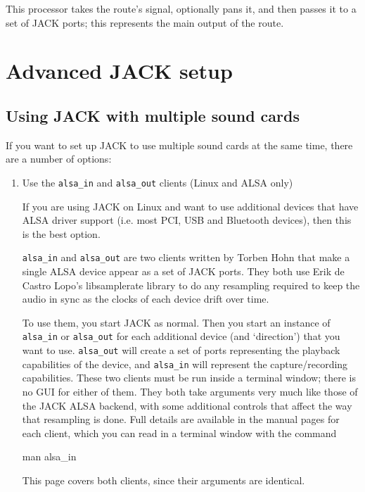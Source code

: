 \documentclass[10pt,a4paper]{book}
\begin{document}
This processor takes the route's signal, optionally pans it, and then
passes it to a set of JACK ports; this represents the main output of
the route.


\appendix
\chapter{Advanced JACK setup}
\label{ap:advanced-jack}

\section{Using JACK with multiple sound cards}

If you want to set up JACK to use multiple sound cards at the same
time, there are a number of options:

\begin{enumerate}

\item Use the \texttt{alsa\_in} and \texttt{alsa\_out} clients (Linux and ALSA only)

If you are using JACK on Linux and want to use additional devices that
have ALSA driver support (i.e. most PCI, USB and Bluetooth devices),
then this is the best option.

\texttt{alsa\_in} and \texttt{alsa\_out} are two clients written by
Torben Hohn that make a single ALSA device appear as a set
of JACK ports. They both use Erik de Castro Lopo's libsamplerate
library to do any resampling required to keep the audio in sync as the
clocks of each device drift over time.

To use them, you start JACK as normal. Then you start an instance of
\texttt{alsa\_in} or \texttt{alsa\_out} for each additional device
(and `direction') that you want to use. \texttt{alsa\_out} will create
a set of ports representing the playback capabilities of the device,
and \texttt{alsa\_in} will represent the capture/recording
capabilities. These two clients must be run inside a terminal window; 
there is no GUI for either of them. They both take arguments very much
like those of the JACK ALSA backend, with some additional controls
that affect the way that resampling is done. Full details are
available in the manual pages for each client, which you can read in a
terminal window with the command

\begin{listing}
man alsa\_in
\end{listing}

This page covers both clients, since their arguments are identical.


\end{enumerate}
\end{document}
